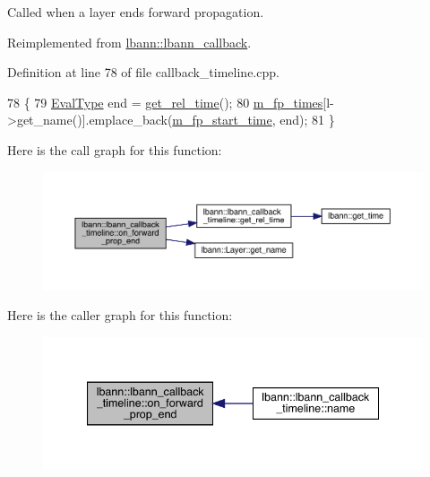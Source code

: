 Called when a layer ends forward propagation. 

Reimplemented from \hyperlink{classlbann_1_1lbann__callback_a5eff0a59fbce98a981d9cdd0547a3ad5}{lbann\+::lbann\+\_\+callback}.



Definition at line 78 of file callback\+\_\+timeline.\+cpp.


\begin{DoxyCode}
78                                                                     \{
79   \hyperlink{base_8hpp_a3266f5ac18504bbadea983c109566867}{EvalType} end = \hyperlink{classlbann_1_1lbann__callback__timeline_a67da1376356bf2153ab67489014e0ad4}{get\_rel\_time}();
80   \hyperlink{classlbann_1_1lbann__callback__timeline_ab43061b16cd5d29045be1d9294a80ef1}{m\_fp\_times}[l->get\_name()].emplace\_back(\hyperlink{classlbann_1_1lbann__callback__timeline_a5c24aa919edfcd34fce577ef17e9153f}{m\_fp\_start\_time}, end);
81 \}
\end{DoxyCode}
Here is the call graph for this function\+:\nopagebreak
\begin{figure}[H]
\begin{center}
\leavevmode
\includegraphics[width=350pt]{classlbann_1_1lbann__callback__timeline_a28f4387fda222bf988d744e0b2ec8b4b_cgraph}
\end{center}
\end{figure}
Here is the caller graph for this function\+:\nopagebreak
\begin{figure}[H]
\begin{center}
\leavevmode
\includegraphics[width=340pt]{classlbann_1_1lbann__callback__timeline_a28f4387fda222bf988d744e0b2ec8b4b_icgraph}
\end{center}
\end{figure}
\mbox{\label{classlbann_1_1lbann__callback__timeline_a2037300798c70d831845c7efaf5de6c2}} 
